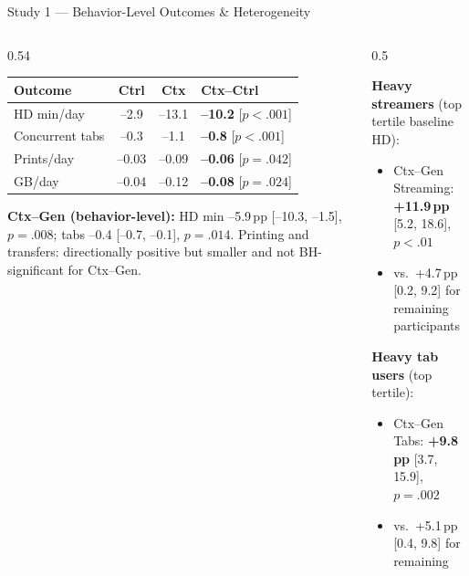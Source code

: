 \documentclass[10pt,aspectratio=169]{beamer}
\newcommand{\emphmark}[1]{\textcolor{chiAccent}{\textbf{#1}}}
\begin{document}

\begin{frame}{Study 1 --- Behavior-Level Outcomes \& Heterogeneity}
\begin{columns}[T]
\begin{column}{0.54\textwidth}
\begin{keybox}
\scriptsize
\renewcommand{\arraystretch}{1.1}
\begin{tabular}{@{}lccl@{}}
\toprule
\textbf{Outcome} & \textbf{Ctrl} & \textbf{Ctx} & \textbf{Ctx--Ctrl} \\
\midrule
HD min/day & --2.9 & --13.1 & \textbf{--10.2} [$p{<}.001$] \\
Concurrent tabs & --0.3 & --1.1 & \textbf{--0.8} [$p{<}.001$] \\
Prints/day & --0.03 & --0.09 & \textbf{--0.06} [$p{=}.042$] \\
GB/day & --0.04 & --0.12 & \textbf{--0.08} [$p{=}.024$] \\
\bottomrule
\end{tabular}
\end{keybox}
\vspace{4pt}
\begin{findingbox}
\scriptsize
\textbf{Ctx--Gen (behavior-level):} HD min --5.9\,pp [--10.3, --1.5], $p{=}.008$; tabs --0.4 [--0.7, --0.1], $p{=}.014$. Printing and transfers: directionally positive but smaller and not BH-significant for Ctx--Gen.
\end{findingbox}
\end{column}
\begin{column}{0.5\textwidth}
\begin{alertbox}
\scriptsize
\textbf{Heavy streamers} (top tertile baseline HD):
\begin{itemize}\setlength\itemsep{1pt}
  \item Ctx--Gen Streaming: \emphmark{+11.9\,pp} [5.2, 18.6], $p{<}.01$
  \item vs.\ +4.7\,pp [0.2, 9.2] for remaining participants
\end{itemize}
\vspace{1pt}
\textbf{Heavy tab users} (top tertile):
\begin{itemize}\setlength\itemsep{1pt}
  \item Ctx--Gen Tabs: \emphmark{+9.8\,pp} [3.7, 15.9], $p{=}.002$
  \item vs.\ +5.1\,pp [0.4, 9.8] for remaining

\end{itemize}
\end{alertbox}
\end{column}
\end{columns}
\end{frame}
\end{document}
